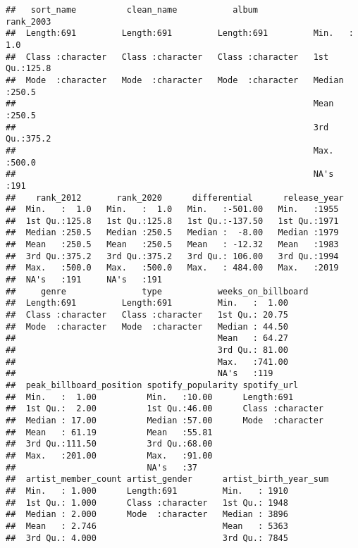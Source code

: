 \documentclass[
]{article}
\begin{document}
\begin{verbatim}
##   sort_name          clean_name           album             rank_2003    
##  Length:691         Length:691         Length:691         Min.   :  1.0  
##  Class :character   Class :character   Class :character   1st Qu.:125.8  
##  Mode  :character   Mode  :character   Mode  :character   Median :250.5  
##                                                           Mean   :250.5  
##                                                           3rd Qu.:375.2  
##                                                           Max.   :500.0  
##                                                           NA's   :191    
##    rank_2012       rank_2020      differential      release_year 
##  Min.   :  1.0   Min.   :  1.0   Min.   :-501.00   Min.   :1955  
##  1st Qu.:125.8   1st Qu.:125.8   1st Qu.:-137.50   1st Qu.:1971  
##  Median :250.5   Median :250.5   Median :  -8.00   Median :1979  
##  Mean   :250.5   Mean   :250.5   Mean   : -12.32   Mean   :1983  
##  3rd Qu.:375.2   3rd Qu.:375.2   3rd Qu.: 106.00   3rd Qu.:1994  
##  Max.   :500.0   Max.   :500.0   Max.   : 484.00   Max.   :2019  
##  NA's   :191     NA's   :191                                     
##     genre               type           weeks_on_billboard
##  Length:691         Length:691         Min.   :  1.00    
##  Class :character   Class :character   1st Qu.: 20.75    
##  Mode  :character   Mode  :character   Median : 44.50    
##                                        Mean   : 64.27    
##                                        3rd Qu.: 81.00    
##                                        Max.   :741.00    
##                                        NA's   :119       
##  peak_billboard_position spotify_popularity spotify_url       
##  Min.   :  1.00          Min.   :10.00      Length:691        
##  1st Qu.:  2.00          1st Qu.:46.00      Class :character  
##  Median : 17.00          Median :57.00      Mode  :character  
##  Mean   : 61.19          Mean   :55.81                        
##  3rd Qu.:111.50          3rd Qu.:68.00                        
##  Max.   :201.00          Max.   :91.00                        
##                          NA's   :37                           
##  artist_member_count artist_gender      artist_birth_year_sum
##  Min.   : 1.000      Length:691         Min.   : 1910        
##  1st Qu.: 1.000      Class :character   1st Qu.: 1948        
##  Median : 2.000      Mode  :character   Median : 3896        
##  Mean   : 2.746                         Mean   : 5363        
##  3rd Qu.: 4.000                         3rd Qu.: 7845        

\end{verbatim}
\end{document}
